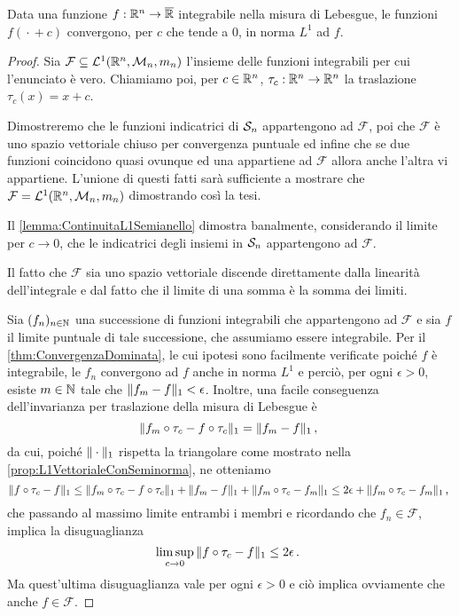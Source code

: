 \begin{proposition}[Continuità $L^1$]\label{prop:ContinuitaL1}
	Data una funzione $f:\R^n\to\Rbar$ integrabile nella misura di Lebesgue, le funzioni $f({}\cdot{}+c)$ convergono, per $c$ che tende a $0$, in norma $L^1$ ad $f$.
\end{proposition}
\begin{proof}
	Sia $\mathcal F\subseteq \L(\R^n,\M_n,m_n)$ l'insieme delle funzioni integrabili per cui l'enunciato è vero.
	Chiamiamo poi, per $c\in\R^n$, $\tau_c:\R^n\to\R^n$ la traslazione $\tau_c(x)=x+c$.
	
	Dimostreremo che le funzioni indicatrici di $\S_n$ appartengono ad $\mathcal F$, poi che $\mathcal F$ è uno spazio vettoriale chiuso per convergenza puntuale ed infine che se due funzioni coincidono quasi ovunque ed una appartiene ad $\mathcal F$ allora anche l'altra vi appartiene. 
	L'unione di questi fatti sarà sufficiente a mostrare che $\mathcal F=\L(\R^n,\M_n,m_n)$ dimostrando così la tesi.
	
	Il \cref{lemma:ContinuitaL1Semianello} dimostra banalmente, considerando il limite per $c\to 0$, che le indicatrici degli insiemi in $\S_n$ appartengono ad $\mathcal F$.
	
	Il fatto che $\mathcal F$ sia uno spazio vettoriale discende direttamente dalla linearità dell'integrale e dal fatto che il limite di una somma è la somma dei limiti.
	
	Sia $(f_n)_{n\in\N}$ una successione di funzioni integrabili che appartengono ad $\mathcal F$ e sia $f$ il limite puntuale di tale successione, che assumiamo essere integrabile.
	Per il \cref{thm:ConvergenzaDominata}, le cui ipotesi sono facilmente verificate poiché $f$ è integrabile, le $f_n$ convergono ad $f$ anche in norma $L^1$ e perciò, per ogni $\epsilon>0$, esiste $m\in\N$ tale che $\LNorm{f_m-f}<\epsilon$. 
	Inoltre, una facile conseguenza dell'invarianza per traslazione della misura di Lebesgue è 
	\begin{equation*}
		\LNorm{f_m\circ\tau_c-f\circ\tau_c}=\LNorm{f_m-f} \virgola
	\end{equation*}
	da cui, poiché $\LNorm{{}\cdot{}}$ rispetta la triangolare come mostrato nella \cref{prop:L1VettorialeConSeminorma}, ne otteniamo
	\begin{equation*}
		\LNorm{f\circ\tau_c-f}\le \LNorm{f_m\circ\tau_c-f\circ\tau_c}+\LNorm{f_m-f}+\LNorm{f_m\circ\tau_c-f_m} \le 2\epsilon+\LNorm{f_m\circ\tau_c-f_m}\virgola
	\end{equation*}
	che passando al massimo limite entrambi i membri e ricordando che $f_n\in\mathcal F$, implica la disuguaglianza
	\begin{equation*}
		\limsup_{c\to 0} \LNorm{f\circ\tau_c-f} \le 2\epsilon \punto
	\end{equation*}
	Ma quest'ultima disuguaglianza vale per ogni $\epsilon>0$ e ciò implica ovviamente che anche $f\in\mathcal F$.
	

\end{proof}
